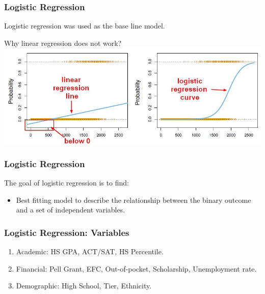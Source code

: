 \documentclass[aspectratio=169]{beamer}
\begin{document}
\begin{frame}
\frametitle{Logistic Regression}
Logistic regression was used as the base line model.

Why linear regression does not work?
\includegraphics[scale=0.345]{pic/logistic_regression_vs_linear.jpg}
\end{frame}

\begin{frame}
    \frametitle{Logistic Regression}


The goal of logistic regression is to find:

\begin{itemize}
\item Best fitting  model to describe the relationship between the 
binary outcome and a set of independent variables. 
\end{itemize}

\end{frame}





\begin{frame}
\frametitle{Logistic Regression: Variables}

\begin{enumerate}
\item Academic: HS GPA, ACT/SAT, HS Percentile.
\item Financial: Pell Grant, EFC, Out-of-pocket, Scholarship,
	Unemployment rate.
\item Demographic: High School, Tier, Ethnicity. 
    
\end{enumerate}

\end{frame}
\end{document}
